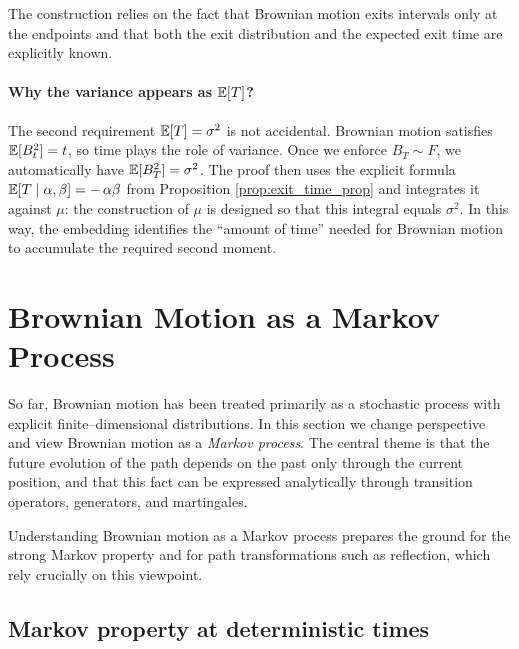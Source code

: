 \begin{remark}
The construction relies on the fact that Brownian motion exits intervals only at the
endpoints and that both the exit distribution and the expected exit time are explicitly
known.
\end{remark}

\begin{remark}
\paragraph{Why the variance appears as $\mathbb{E}[T]$?}
The second requirement $\mathbb{E}[T]=\sigma^2$ is not accidental.
Brownian motion satisfies $\mathbb{E}[B_t^2]=t$, so time plays the role of variance.
Once we enforce $B_T\sim F$, we automatically have $\mathbb{E}[B_T^2]=\sigma^2$.
The proof then uses the explicit formula $\mathbb{E}[T\mid \alpha,\beta]=-\,\alpha\beta$ from Proposition \ref{prop:exit_time_prop} and integrates it against $\mu$:
the construction of $\mu$ is designed so that this integral equals $\sigma^2$.
In this way, the embedding identifies the ``amount of time'' needed for Brownian motion to accumulate the required second moment.    
\end{remark}


\section{Brownian Motion as a Markov Process}


So far, Brownian motion has been treated primarily as a stochastic process with explicit
finite--dimensional distributions.
In this section we change perspective and view Brownian motion as a \emph{Markov process}.
The central theme is that the future evolution of the path depends on the past only through the
current position, and that this fact can be expressed analytically through transition operators,
generators, and martingales.

Understanding Brownian motion as a Markov process prepares the ground for the strong Markov property
and for path transformations such as reflection, which rely crucially on this viewpoint.


\subsection{Markov property at deterministic times}

